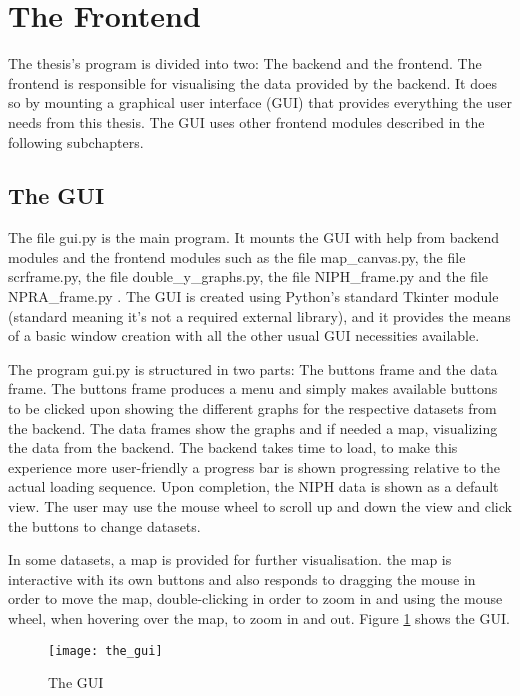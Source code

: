 \newpage










\section{The Frontend}
The thesis's program is divided into two: The backend and the frontend. The frontend is responsible for visualising the data provided by the backend. It does so by mounting a graphical user interface (GUI) that provides everything the user needs from this thesis. The GUI uses other frontend modules described in the following subchapters.

\subsection{The GUI}
The file gui.py is the main program. It mounts the GUI with help from backend modules and the frontend modules such as the file map\_canvas.py, the file scrframe.py, the file double\_y\_graphs.py, the file NIPH\_frame.py and the file NPRA\_frame.py . The GUI is created using Python's standard Tkinter module (standard meaning it's not a required external library), and it provides the means of a basic window creation with all the other usual GUI necessities available. 

The program gui.py is structured in two parts: The buttons frame and the data frame. The buttons frame produces a menu and simply makes available buttons to be clicked upon showing the different graphs for the respective datasets from the backend. The data frames show the graphs and if needed a map, visualizing the data from the backend. The backend takes time to load, to make this experience more user-friendly a progress bar is shown progressing relative to the actual loading sequence. Upon completion, the NIPH data is shown as a default view. The user may use the mouse wheel to scroll up and down the view and click the buttons to change datasets. 

In some datasets, a map is provided for further visualisation. the map is interactive with its own buttons and also responds to dragging the mouse in order to move the map, double-clicking in order to zoom in and using the mouse wheel, when hovering over the map, to zoom in and out. Figure \ref{fig:the_gui} shows the GUI.

\begin{figure}[ht]
\texttt{[image: the\_gui]}
\centering
\caption{The GUI}
\label{fig:the_gui}
\end{figure}



